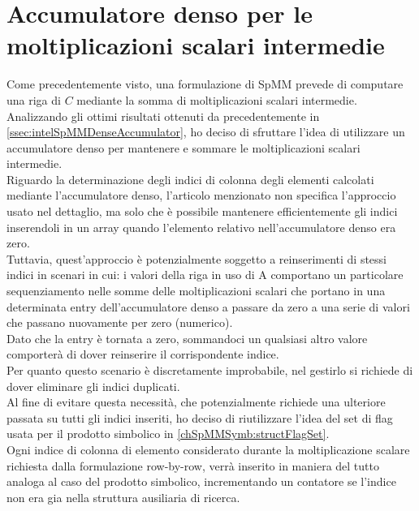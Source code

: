 \section{Accumulatore denso per le moltiplicazioni scalari intermedie} \label{chSpMMNum:scSparseVectMulPart}
Come precedentemente visto, una formulazione \rowbyrow di SpMM prevede di computare una riga di $C$ 
mediante la somma di moltiplicazioni scalari intermedie.\\
Analizzando gli ottimi risultati ottenuti da \cite{intelSpMMDenseAccumulator} precedentemente in 
\ref{ssec:intelSpMMDenseAccumulator}, ho deciso di sfruttare l'idea di utilizzare un accumulatore denso per 
mantenere e sommare le moltiplicazioni scalari intermedie.\\
Riguardo la determinazione degli indici di colonna degli elementi \nnz calcolati mediante l'accumulatore denso,
l'articolo menzionato \cite{intelSpMMDenseAccumulator} non specifica l'approccio usato nel dettaglio, 
ma solo che è possibile mantenere efficientemente gli indici inserendoli in un array quando l'elemento relativo nell'accumulatore denso era zero.\\
Tuttavia, quest'approccio è potenzialmente soggetto a reinserimenti di stessi indici in scenari in cui:
i valori \nnz della riga in uso di A comportano un particolare sequenziamento nelle somme delle moltiplicazioni scalari che portano
in una determinata entry dell'accumulatore denso a passare da zero a una serie di valori che 
passano nuovamente per zero (numerico).\\
Dato che la entry è tornata a zero, sommandoci un qualsiasi altro valore \nnz 
comporterà di dover reinserire il corrispondente indice.\\
Per quanto questo scenario è discretamente improbabile, %
nel gestirlo si richiede di dover eliminare gli indici duplicati.\\
Al fine di evitare questa necessità, che potenzialmente richiede una ulteriore passata su tutti gli indici inseriti,
ho deciso di riutilizzare l'idea del set di flag usata per il prodotto simbolico in \ref{chSpMMSymb:structFlagSet}.\\
Ogni indice di colonna di elemento \nnz considerato durante la moltiplicazione scalare richiesta dalla formulazione row-by-row, 
verrà inserito in maniera del tutto analoga al caso del prodotto simbolico, incrementando un contatore se l'indice 
non era gia nella struttura ausiliaria di ricerca.\\
